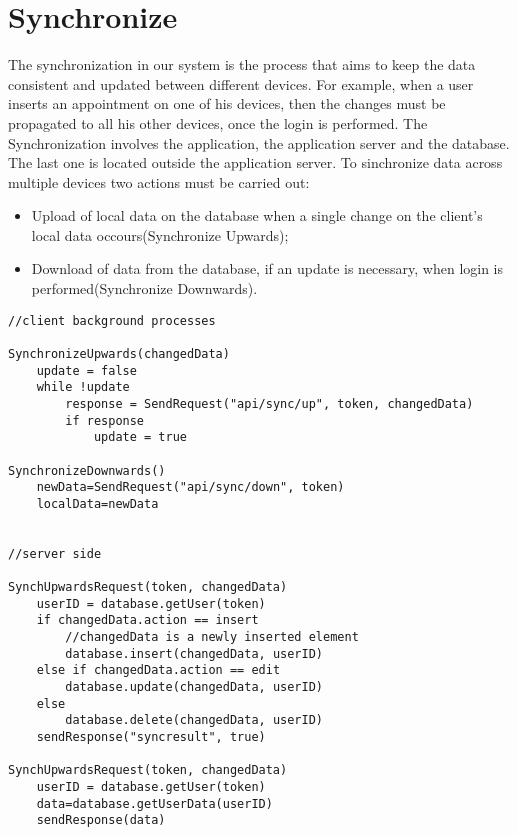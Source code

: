 \section{Synchronize}
The synchronization in our system is the process that aims to keep the data consistent and updated between different devices. For example, when a user inserts an appointment on one of his devices, then the changes must be propagated to all his other devices, once the login is performed. 
The Synchronization involves the application, the application server and the database. The last one is located outside the application server. To sinchronize data across multiple devices two actions must be carried out:
\begin{itemize}
\item Upload of local data on the database when a single change on the  client's local data occours(Synchronize Upwards);
\item Download of data from the database, if an update is necessary, when login is performed(Synchronize Downwards).
\end{itemize}

\begin{lstlisting}
//client background processes

SynchronizeUpwards(changedData)
	update = false
	while !update
		response = SendRequest("api/sync/up", token, changedData)
		if response	 
			update = true
			
SynchronizeDownwards()
	newData=SendRequest("api/sync/down", token)
	localData=newData
		
		
//server side

SynchUpwardsRequest(token, changedData)
	userID = database.getUser(token)
	if changedData.action == insert
		//changedData is a newly inserted element
		database.insert(changedData, userID)
	else if changedData.action == edit
		database.update(changedData, userID)
	else
		database.delete(changedData, userID)
	sendResponse("syncresult", true)
	
SynchUpwardsRequest(token, changedData)
	userID = database.getUser(token)
	data=database.getUserData(userID)
	sendResponse(data)

\end{lstlisting}




		